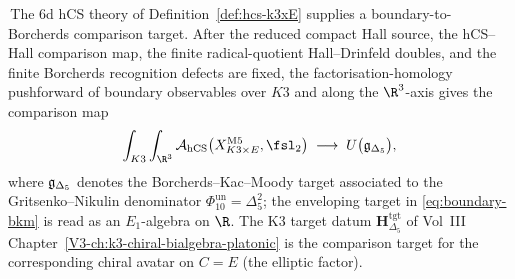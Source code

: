 \begin{theorem}
\label{thm:hcs-k3xE-bkm-identification}
%
%
\ClaimStatusConditional\,The 6d hCS theory of
Definition~\ref{def:hcs-k3xE} supplies a boundary-to-Borcherds
comparison target. After the reduced compact Hall source, the
hCS--Hall comparison map, the finite radical-quotient
Hall--Drinfeld doubles, and the finite Borcherds recognition defects
are fixed,
the factorisation-homology pushforward of boundary observables over
$K3$ and along the $\R^3$-axis gives the comparison map
\begin{equation}
\label{eq:boundary-bkm}
 \int_{K3}\int_{\R^3}
 \cA_{\hCS}\bigl(X_{K3\times E}^{\mathrm{M5}},\fsl_2\bigr)
 \;\longrightarrow\;
 U\bigl(\fg_{\Delta_5}\bigr),
\end{equation}
where $\mathfrak{g}_{\Delta_5}$ denotes the Borcherds--Kac--Moody target
associated to the Gritsenko--Nikulin denominator
$\Phi_{10}^{\mathrm{un}}=\Delta_5^2$; the enveloping target in
\eqref{eq:boundary-bkm} is read as an $E_1$-algebra on $\R$. The K3
target datum
$\mathbf{H}_{\Delta_5}^{\mathrm{tgt}}$ of Vol~III
Chapter~\ref{V3-ch:k3-chiral-bialgebra-platonic} is the comparison
target for the corresponding chiral avatar on $C = E$ (the elliptic
factor).
\end{theorem}

